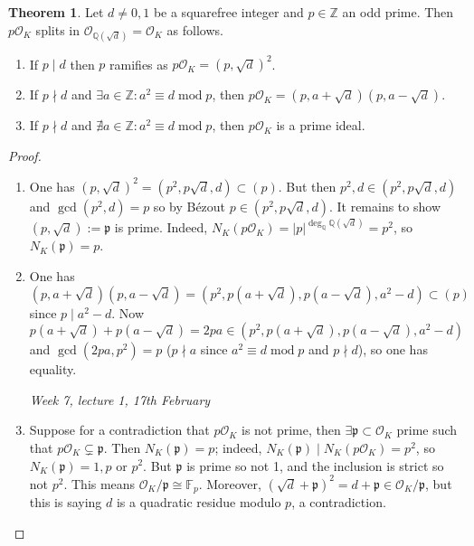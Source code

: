 \documentclass{article}
\newcommand{\Z}{\mathbb{Z}}
\newcommand{\Q}{\mathbb{Q}}
\newcommand{\F}{\mathbb{F}}
\newcommand{\Mod}{\operatorname{mod}}
\newcommand{\ri}{\mathcal{O}}
\newcommand{\ip}{\mathfrak{p}}
\theoremstyle{definition}
\newtheorem{thm}[defn]{Theorem}
\begin{document}
\begin{thm}
\label{thm:quadramoddp}
Let $d\neq 0,1$ be a squarefree integer and $p\in\Z$ an odd prime. Then $p\ri_K$ splits in $\ri_{\Q\left(\sqrt d\right)}=\ri_K$ as follows.
\begin{enumerate}
\item If $p\mid d$ then $p$ ramifies as $p\ri_K=\left(p,\sqrt d\right)^2$.
\item If $p\nmid d$ and $\exists a\in\Z:a^2\equiv d\Mod p$, then $p\ri_K=\left(p,a+\sqrt d\right)\left(p,a-\sqrt d\right)$.
\item If $p\nmid d$ and $\nexists a\in\Z:a^2\equiv d\Mod p$, then $p\ri_K$ is a prime ideal.
\end{enumerate}
\end{thm}
\begin{proof}
\begin{enumerate}
\item One has $\left(p,\sqrt d\right)^2=\left(p^2,p\sqrt d,d\right)\subset (p)$. But then $p^2,d\in\left(p^2,p\sqrt d,d\right)$ and $\gcd (p^2,d)=p$ so by Bézout $p\in \left(p^2,p\sqrt d,d\right)$. It remains to show $\left(p,\sqrt d\right):=\ip$ is prime. Indeed, $N_K(p\ri_K)=|p|^{\deg_\Q\Q\left(\sqrt d\right)}=p^2$, so $N_K(\ip)=p$.
\item One has
\[
\left(p,a+\sqrt d\right)\left(p,a-\sqrt d\right)=\left(p^2,p\left(a+\sqrt d\right),p\left(a-\sqrt d\right),a^2-d\right)\subset(p)
\]
since $p\mid a^2-d$. Now $p\left(a+\sqrt d\right)+p\left(a-\sqrt d\right)=2pa\in\left(p^2,p\left(a+\sqrt d\right),p\left(a-\sqrt d\right),a^2-d\right)$ and $\gcd(2pa,p^2)=p$ ($p\nmid a$ since $a^2\equiv d\Mod p$ and $p\nmid d$), so one has equality.

\begin{flushright}
\textit{Week 7, lecture 1, 17th February}
\end{flushright}

\item Suppose for a contradiction that $p\ri_K$ is not prime, then $\exists\ip\subset\ri_K$ prime such that $p\ri_K\subsetneq\ip$. Then $N_K(\ip)=p$; indeed, $N_K(\ip)\mid N_K(p\ri_K)=p^2$, so $N_K(\ip)=1,p$ or $p^2$. But $\ip$ is prime so not 1, and the inclusion is strict so not $p^2$. This means $\ri_K/\ip\cong\F_p$. Moreover, $\left(\sqrt d+\ip\right)^2=d+\ip\in\ri_K/\ip$, but this is saying $d$ is a quadratic residue modulo $p$, a contradiction.
\end{enumerate}
\end{proof}
\end{document}
